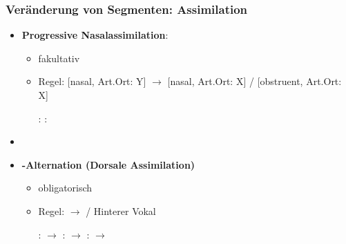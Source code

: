 \begin{frame}
\frametitle{Veränderung von Segmenten: Assimilation}

\begin{itemize}
	\item \textbf{Progressive Nasalassimilation}:

	\begin{itemize}
		\item fakultativ
		\item Regel: [nasal, Art.Ort: Y] $\rightarrow$ [nasal, Art.Ort: X] /  [obstruent, Art.Ort: X] \underline{\quad} 

	\eal
		\ex {}:  \ras 
		 \ras {}
		\ex {}:  \ras 
		 \ras {}
	\zl
	
	\end{itemize}

	\item[]
	\item \textbf{\textipa{[\c{c}]/[x]}-Alternation (Dorsale Assimilation)}

	\begin{itemize}
		\item obligatorisch
		\item Regel:  $\rightarrow$ \textipa{[x]} / Hinterer Vokal \underline{\quad}

	\eal
		\ex {}:  $\rightarrow$ \textipa{[mI\alertred{\c{c}}]}
		\ex {}:  $\rightarrow$ \textipa{[bu:\alertred{x}]}
		\ex {}:  $\rightarrow$ 
	\zl
	
	\end{itemize}		

\end{itemize}

\end{frame}


